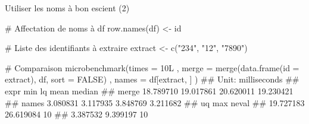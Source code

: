 \documentclass[12pt,ignorenonframetext,]{beamer}
\newenvironment{Shaded}{}{}
\newcommand{\CommentTok}[1]{\textcolor[rgb]{0.00,0.50,0.00}{#1}}
\newcommand{\DataTypeTok}[1]{#1}
\newcommand{\KeywordTok}[1]{\textcolor[rgb]{0.00,0.00,1.00}{#1}}
\newcommand{\NormalTok}[1]{#1}
\newcommand{\OtherTok}[1]{\textcolor[rgb]{1.00,0.25,0.00}{#1}}
\newcommand{\StringTok}[1]{\textcolor[rgb]{0.00,0.50,0.50}{#1}}
\renewenvironment{Shaded}{\begin{snugshade}}{\end{snugshade}}
\begin{document}
\begin{frame}[fragile]{Utiliser les noms à bon escient (2)}
\protect\hypertarget{utiliser-les-noms-a-bon-escient-2}{}

\footnotesize

\begin{Shaded}
\begin{Highlighting}[]
\CommentTok{# Affectation de noms à df }
\KeywordTok{row.names}\NormalTok{(df) <-}\StringTok{ }\NormalTok{id}

\CommentTok{# Liste des identifiants à extraire}
\NormalTok{extract <-}\StringTok{ }\KeywordTok{c}\NormalTok{(}\StringTok{"234"}\NormalTok{, }\StringTok{"12"}\NormalTok{, }\StringTok{"7890"}\NormalTok{)}

\CommentTok{# Comparaison}
\KeywordTok{microbenchmark}\NormalTok{(}\DataTypeTok{times =}\NormalTok{ 10L}
\NormalTok{  , }\DataTypeTok{merge =} \KeywordTok{merge}\NormalTok{(}\KeywordTok{data.frame}\NormalTok{(}\DataTypeTok{id =}\NormalTok{ extract), df, }\DataTypeTok{sort =} \OtherTok{FALSE}\NormalTok{)}
\NormalTok{  , }\DataTypeTok{names =}\NormalTok{ df[extract, ]}
\NormalTok{)}
\NormalTok{  ## Unit: milliseconds}
\NormalTok{  ##   expr       min        lq      mean    median}
\NormalTok{  ##  merge 18.789710 19.017861 20.620011 19.230421}
\NormalTok{  ##  names  3.080831  3.117935  3.848769  3.211682}
\NormalTok{  ##         uq       max neval}
\NormalTok{  ##  19.727183 26.619084    10}
\NormalTok{  ##   3.387532  9.399197    10}
\end{Highlighting}
\end{Shaded}

\end{frame}
\end{document}
